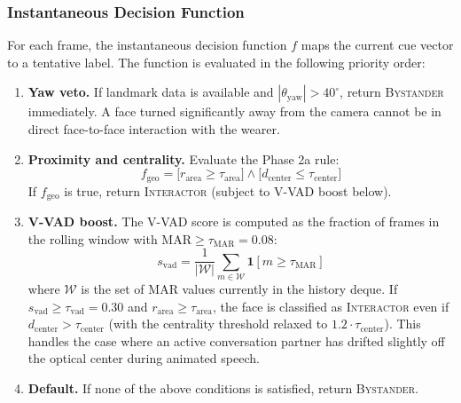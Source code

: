 \subsubsection*{Instantaneous Decision Function}

For each frame, the instantaneous decision function $f$ maps the current cue vector to a
tentative label. The function is evaluated in the following priority order:

\begin{enumerate}
  \item \textbf{Yaw veto.} If landmark data is available and
        $|\theta_{\mathrm{yaw}}| > 40^\circ$, return \textsc{Bystander} immediately.
        A face turned significantly away from the camera cannot be in direct face-to-face
        interaction with the wearer.

  \item \textbf{Proximity and centrality.} Evaluate the Phase 2a rule:
        \begin{equation}
          f_{\mathrm{geo}} = \bigl[r_{\mathrm{area}} \geq \tau_{\mathrm{area}}\bigr]
                             \wedge
                             \bigl[d_{\mathrm{center}} \leq \tau_{\mathrm{center}}\bigr]
          \label{eq:geo_rule}
        \end{equation}
        If $f_{\mathrm{geo}}$ is true, return \textsc{Interactor} (subject to V-VAD
        boost below).

  \item \textbf{V-VAD boost.} The V-VAD score is computed as the fraction of frames in
        the rolling window with $\mathrm{MAR} \geq \tau_{\mathrm{MAR}} = 0.08$:
        \begin{equation}
          s_{\mathrm{vad}} = \frac{1}{|\mathcal{W}|} \sum_{m \in \mathcal{W}}
                             \mathbf{1}\!\left[m \geq \tau_{\mathrm{MAR}}\right]
          \label{eq:vvad}
        \end{equation}
        where $\mathcal{W}$ is the set of MAR values currently in the history deque.
        If $s_{\mathrm{vad}} \geq \tau_{\mathrm{vad}} = 0.30$ and
        $r_{\mathrm{area}} \geq \tau_{\mathrm{area}}$, the face is classified as
        \textsc{Interactor} even if $d_{\mathrm{center}} > \tau_{\mathrm{center}}$
        (with the centrality threshold relaxed to $1.2 \cdot \tau_{\mathrm{center}}$).
        This handles the case where an active conversation partner has drifted slightly
        off the optical center during animated speech.

  \item \textbf{Default.} If none of the above conditions is satisfied, return
        \textsc{Bystander}.
\end{enumerate}

